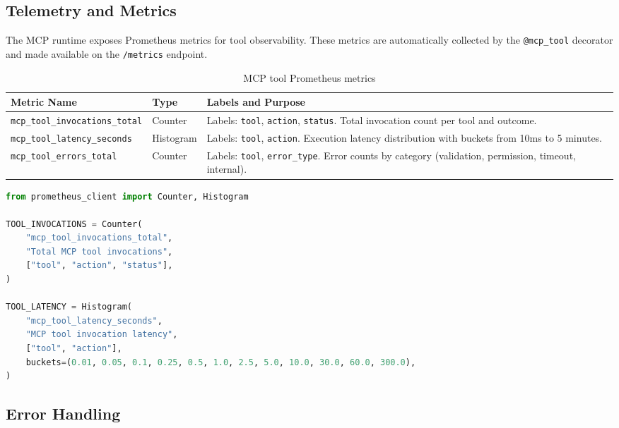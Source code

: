 \subsection{Telemetry and Metrics}
\label{subsec:mcp-telemetry}

The MCP runtime exposes Prometheus metrics for tool observability. These metrics are automatically collected by the \texttt{@mcp\_tool} decorator and made available on the \texttt{/metrics} endpoint.

\begin{table}[htbp]
    \centering
    \caption{MCP tool Prometheus metrics}
    \label{tab:mcp-metrics}
    \begin{tabularx}{\textwidth}{llX}
        \toprule
        \textbf{Metric Name} & \textbf{Type} & \textbf{Labels and Purpose} \\
        \midrule
        \texttt{mcp\_tool\_invocations\_total} & Counter & Labels: \texttt{tool}, \texttt{action}, \texttt{status}. Total invocation count per tool and outcome. \\
        \texttt{mcp\_tool\_latency\_seconds} & Histogram & Labels: \texttt{tool}, \texttt{action}. Execution latency distribution with buckets from 10ms to 5 minutes. \\
        \texttt{mcp\_tool\_errors\_total} & Counter & Labels: \texttt{tool}, \texttt{error\_type}. Error counts by category (validation, permission, timeout, internal). \\
        \bottomrule
    \end{tabularx}
\end{table}

\begin{lstlisting}[language=Python, caption={Prometheus metrics collection in MCP runtime}, label={lst:mcp-prometheus}]
from prometheus_client import Counter, Histogram

TOOL_INVOCATIONS = Counter(
    "mcp_tool_invocations_total",
    "Total MCP tool invocations",
    ["tool", "action", "status"],
)

TOOL_LATENCY = Histogram(
    "mcp_tool_latency_seconds",
    "MCP tool invocation latency",
    ["tool", "action"],
    buckets=(0.01, 0.05, 0.1, 0.25, 0.5, 1.0, 2.5, 5.0, 10.0, 30.0, 60.0, 300.0),
)
\end{lstlisting}

\subsection{Error Handling}
\label{subsec:mcp-error-handling}

